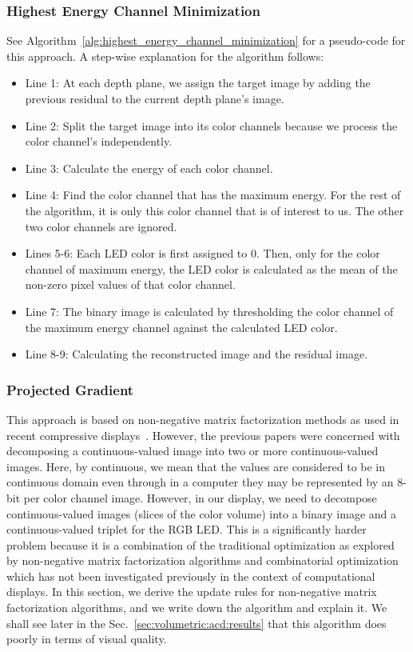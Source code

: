 \subsubsection{Highest Energy Channel Minimization}
\label{sec:acd:highestenergy}

See Algorithm~\ref{alg:highest_energy_channel_minimization} for a pseudo-code for this approach. A step-wise explanation for the algorithm follows:
\begin{itemize}
    \item Line 1: At each depth plane, we assign the target image by adding the previous residual to the current depth plane's image. 
    \item Line 2: Split the target image into its color channels because we process the color channel's independently.
    \item Line 3: Calculate the energy of each color channel.
    \item Line 4: Find the color channel that has the maximum energy. For the rest of the algorithm, it is only this color channel that is of interest to us. The other two color channels are ignored.
    \item Lines 5-6: Each LED color is first assigned to 0. Then, only for the color channel of maximum energy, the LED color is calculated as the mean of the non-zero pixel values of that color channel.
    \item Line 7: The binary image is calculated by thresholding the color channel of the maximum energy channel against the calculated LED color.
    \item Line 8-9: Calculating the reconstructed image and the residual image.
 \end{itemize}


\subsubsection{Projected Gradient}
\label{sec:acd:projected_gradient}
This approach is based on non-negative matrix factorization methods as used in recent compressive displays~\cite{Wetzstein2012,Huang2015Light,huang2017mixed}. 
However, the previous papers were concerned with decomposing a continuous-valued image into two or more continuous-valued images. 
Here, by continuous, we mean that the values are considered to be in continuous domain even through in a computer they may be represented by an 8-bit per color channel image. 
However, in our display, we need to decompose continuous-valued images (slices of the color volume) into a binary image and a continuous-valued triplet for the RGB LED. 
This is a significantly harder problem because it is a combination of the traditional optimization as explored by non-negative matrix factorization algorithms and combinatorial optimization which has not been investigated previously in the context of computational displays. 
In this section, we derive the update rules for non-negative matrix factorization algorithms, and we write down the algorithm and explain it.
We shall see later in the Sec.~\ref{sec:volumetric:acd:results} that this algorithm does poorly in terms of visual quality.

